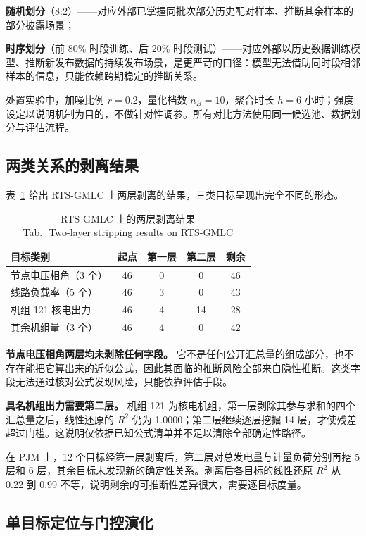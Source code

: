 \documentclass[UTF8,zihao=5,twoside]{ctexart}
\newcommand{\tabbicaption}[2]{\caption{#1\\[-0.2em]\small Tab.\,\thetable\ #2}}
\begin{document}
\textbf{随机划分}（8:2）——对应外部已掌握同批次部分历史配对样本、推断其余样本的部分披露场景；

\textbf{时序划分}（前 80\% 时段训练、后 20\% 时段测试）——对应外部以历史数据训练模型、推断新发布数据的持续发布场景，是更严苛的口径：模型无法借助同时段相邻样本的信息，只能依赖跨期稳定的推断关系。

处置实验中，加噪比例 $r=0.2$，量化档数 $n_B=10$，聚合时长 $h=6$ 小时；强度设定以说明机制为目的，不做针对性调参。所有对比方法使用同一候选池、数据划分与评估流程。

\subsection{两类关系的剥离结果}

表~\ref{tab:strip} 给出 RTS-GMLC 上两层剥离的结果，三类目标呈现出完全不同的形态。

\begin{table}[!tbp]
\centering
\tabbicaption{RTS-GMLC 上的两层剥离结果}{Two-layer stripping results on RTS-GMLC}
\label{tab:strip}
\setlength{\tabcolsep}{3.5pt}
\begin{tabular}{lcccc}
\toprule
目标类别 & 起点 & 第一层 & 第二层 & 剩余 \\
\midrule
节点电压相角（3 个） & 46 & 0 & 0 & 46 \\
线路负载率（5 个） & 46 & 3 & 0 & 43 \\
机组 121 核电出力 & 46 & 4 & 14 & 28 \\
其余机组量（3 个） & 46 & 4 & 0 & 42 \\
\bottomrule
\end{tabular}
\end{table}

\textbf{节点电压相角两层均未剥除任何字段。} 它不是任何公开汇总量的组成部分，也不存在能把它算出来的近似公式，因此其面临的推断风险全部来自隐性推断。这类字段无法通过核对公式发现风险，只能依靠评估手段。

\textbf{具名机组出力需要第二层。} 机组 121 为核电机组，第一层剥除其参与求和的四个汇总量之后，线性还原的 $R^2$ 仍为 1.0000；第二层继续逐层挖掘 14 层，才使残差超过门槛。这说明仅依据已知公式清单并不足以清除全部确定性路径。

在 PJM 上，12 个目标经第一层剥离后，第二层对总发电量与计量负荷分别再挖 5 层和 6 层，其余目标未发现新的确定性关系。剥离后各目标的线性还原 $R^2$ 从 0.22 到 0.99 不等，说明剩余的可推断性差异很大，需要逐目标度量。

\subsection{单目标定位与门控演化}
\end{document}
